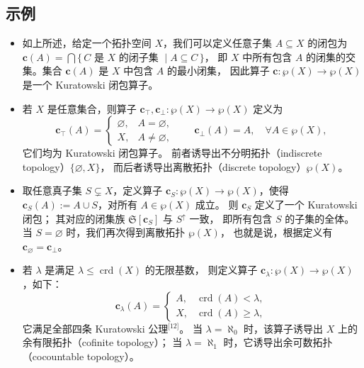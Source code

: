 \subsection{示例}
\begin{itemize}
\item 如上所述，给定一个拓扑空间 $X$，我们可以定义任意子集 $A \subseteq X$ 的闭包为
$\mathbf{c}(A) = \bigcap \{\, C \text{ 是 } X \text{ 的闭子集 } \mid A \subseteq C \,\}$，
即 $X$ 中所有包含 $A$ 的闭集的交集。集合 $\mathbf{c}(A)$ 是 $X$ 中包含 $A$ 的最小闭集，
因此算子 $\mathbf{c} : \wp(X) \to \wp(X)$ 是一个 Kuratowski 闭包算子。
\item 若 $X$ 是任意集合，则算子
$\mathbf{c}_{\top}, \mathbf{c}_{\bot} : \wp(X) \to \wp(X)$ 定义为
\[
\mathbf{c}_{\top}(A) =
\begin{cases}
\varnothing, & A = \varnothing, \\
X, & A \neq \varnothing,
\end{cases}
\qquad
\mathbf{c}_{\bot}(A) = A, \quad \forall A \in \wp(X),~
\]
它们均为 Kuratowski 闭包算子。
前者诱导出不分明拓扑（indiscrete topology）$\{\varnothing, X\}$，
而后者诱导出离散拓扑（discrete topology）$\wp(X)$。
\item 取任意真子集 $S \subsetneq X$，定义算子
$\mathbf{c}_{S} : \wp(X) \to \wp(X)$，使得
$\mathbf{c}_{S}(A) := A \cup S$，对所有 $A \in \wp(X)$ 成立。
则 $\mathbf{c}_{S}$ 定义了一个 Kuratowski 闭包；
其对应的闭集族 ${\mathfrak{S}}[\mathbf{c}_{S}]$ 与 $S^{\uparrow}$ 一致，
即所有包含 $S$ 的子集的全体。
当 $S = \varnothing$ 时，我们再次得到离散拓扑 $\wp(X)$，
也就是说，根据定义有 $\mathbf{c}_{\varnothing} = \mathbf{c}_{\bot}$。
\item 若 $\lambda$ 是满足 $\lambda \leq \operatorname{crd}(X)$ 的无限基数，
则定义算子 $\mathbf{c}_{\lambda} : \wp(X) \to \wp(X)$，如下：
\[
\mathbf{c}_{\lambda}(A) =
\begin{cases}
A, & \operatorname{crd}(A) < \lambda, \\
X, & \operatorname{crd}(A) \geq \lambda,
\end{cases}~
\]
它满足全部四条 Kuratowski 公理\(^\text{[12]}\)。
当 $\lambda = \aleph_{0}$ 时，该算子诱导出 $X$ 上的余有限拓扑（cofinite topology）；
当 $\lambda = \aleph_{1}$ 时，它诱导出余可数拓扑（cocountable topology）。
\end{itemize}